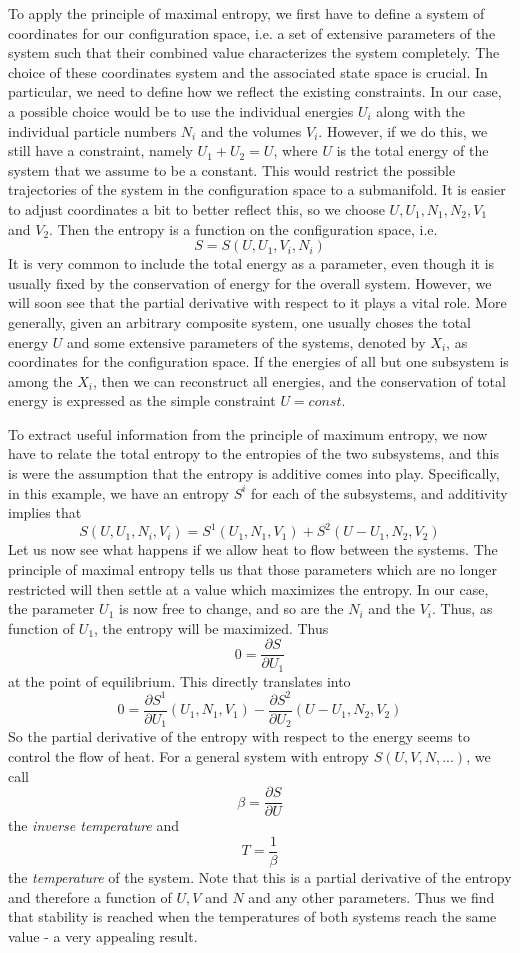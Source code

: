 \documentclass[a4paper, draft]{article}
\theoremstyle{own}
\theoremstyle{remark}
\begin{document}
To apply the principle of maximal entropy, we first have to define a system of coordinates for our configuration space, i.e. a set of extensive parameters of the system such that their combined value characterizes the system completely. The choice of these coordinates system and the associated state space is crucial. In particular, we need to define how we reflect the existing constraints. In our case, a possible choice would be to use the individual energies $U_i$ along with the individual particle numbers $N_i$ and the volumes $V_i$. However, if we do this, we still have a constraint, namely $U_1 + U_2 = U$, where $U$ is the total energy of the system that we assume to be a constant. This would restrict the possible trajectories of the system in the configuration space to a submanifold. It is easier to adjust coordinates a bit to better reflect this, so we choose $U, U_1, N_1, N_2, V_1$ and $V_2$. Then the entropy is a function on the configuration space, i.e.
$$
S = S(U, U_1, V_i, N_i)
$$
It is very common to include the total energy as a parameter, even though it is usually fixed by the conservation of energy for the overall system. However, we will soon see that the partial derivative with respect to it plays a vital role. 
More generally, given an arbitrary composite system, one usually choses the total energy $U$ and some extensive parameters of the systems, denoted by $X_i$, as coordinates for the configuration space. If the energies of all but one subsystem is among the $X_i$, then we can reconstruct all energies, and the conservation of total energy is expressed as the simple constraint $U = const$.

 
To extract useful information from the principle of maximum entropy, we now have to relate the total entropy to the entropies of the two subsystems, and this is were the assumption that the entropy is additive comes into play. Specifically, in this example,
we have an entropy $S^i$ for each of the subsystems, and additivity implies that
$$
S(U, U_1, N_i, V_i) = S^1(U_1, N_1, V_1) + S^2(U - U_1, N_2, V_2)
$$
Let us now see what happens if we allow heat to flow between the systems. The principle of maximal entropy tells us that those parameters which are no longer restricted will then settle at a value which maximizes the entropy. In our case, the parameter $U_1$ is now free to change, and so are the $N_i$ and the $V_i$. Thus, as function of $U_1$, the entropy will be maximized. Thus
$$
0 = \frac{\partial S}{\partial U_1}
$$
at the point of equilibrium. This directly translates into 
$$
0 = \frac{\partial S^1}{\partial U_1}(U_1, N_1, V_1) - \frac{\partial S^2}{\partial U_2}(U - U_1, N_2, V_2)
$$
So the partial derivative of the entropy with respect to the energy seems to control the flow of heat. For a general system with entropy $S(U, V, N, ...)$, we call
$$
\beta = \frac{\partial S}{\partial U}
$$
the {\em inverse temperature} and 
$$
T = \frac{1}{\beta}
$$
the {\em temperature} of the system. Note that this is a partial derivative of the entropy and therefore a function of $U, V$ and $N$ and any other parameters. Thus we find that stability is reached when the temperatures of both systems reach the same value - a very appealing result. 
\end{document}
